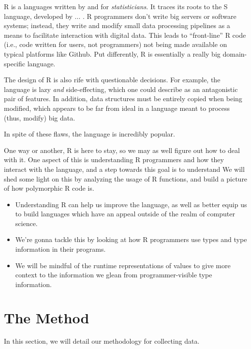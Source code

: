 \documentclass[acmsmall,10pt,review,anonymous]{acmart}\settopmatter{printfolios=true,printccs=false,printacmref=false}
\begin{document}
R is a languages written by and for \textit{statisticians}.  It traces its
roots to the S language, developed by ... .  R programmers don't write big
servers or software systems; instead, they write and modify small data
processing pipelines as a means to facilitate interaction with digital data.
This leads to ``front-line'' R code (i.e., code written for users, not
programmers) not being made available on typical platforms like Github.
  Put differently, R is essentially a really big
domain-specific language.

The design of R is also rife with questionable decisions.  For example, the
language is lazy \textit{and} side-effecting, which one could describe as an
antagonistic pair of features.  In addition, data structures must be
entirely copied when being modified, which appears to be far from ideal in a
language meant to process (thus, modify) big data.

In spite of these flaws, the language is incredibly popular.

One way or another, R is here to stay, so we may as well figure out how to
deal with it.  One aspect of this is understanding R programmers and how
they interact with the language, and a step towards this goal is to
understand   We will shed some light on
this by analyzing the usage of R functions, and build a picture of how
polymorphic R code is.

\begin{itemize}
    \item Understanding R can help us improve the language, as well as
      better equip us to build languages which have an appeal outside of the
      realm of computer science.
    \item We're gonna tackle this by looking at how R programmers use types
      and type information in their programs.
    \item We will be mindful of the runtime representations of values to
      give more context to the information we glean from programmer-visible
      type information.
\end{itemize}

%
%
%
%
%
%
\section{The Method}

In this section, we will detail our methodology for collecting data.
\end{document}
